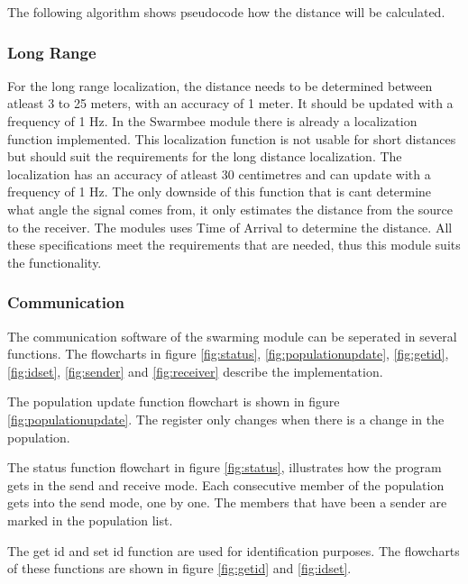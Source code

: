 \documentclass[10pt,a4paper]{article}
\begin{document}
The following algorithm shows pseudocode how the distance will be calculated.


\subsubsection{Long Range}
For the long range localization, the distance needs to be determined between atleast 3 to 25 meters, with an accuracy of 1 meter. It should be updated with a frequency of 1 Hz. In the Swarmbee module there is already a localization function implemented. This localization function is not usable for short distances but should suit the requirements for the long distance localization. The localization has an accuracy of atleast 30 centimetres and can update with a frequency of 1 Hz. The only downside of this function that is cant determine what angle the signal comes from, it only estimates the distance from the source to the receiver. The modules uses Time of Arrival to determine the distance. All these specifications meet the requirements that are needed, thus this module suits the functionality. 


\subsubsection{Communication}
The communication software of the swarming module can be seperated in several functions. The flowcharts in figure \ref{fig:status}, \ref{fig:populationupdate}, \ref{fig:getid}, \ref{fig:idset}, \ref{fig:sender} and \ref{fig:receiver}
describe the implementation.

The population update function flowchart is shown in figure \ref{fig:populationupdate}. The register only changes when there is a change in the population.

The status function flowchart in figure \ref{fig:status}, illustrates how the program gets in the send and receive mode. Each consecutive member of the population gets into the send mode, one by one. The members that have been a sender are marked in the population list.

The get id and set id function are used for identification purposes. The flowcharts of these functions are shown in figure \ref{fig:getid} and \ref{fig:idset}.
\end{document}
